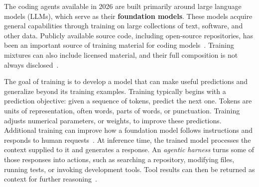 

The coding agents available in 2026 are built primarily around large language models (LLMs), which serve as their \textbf{foundation models}. These models acquire general capabilities through training on large collections of text, software, and other data. Publicly available source code, including open-source repositories, has been an important source of training material for coding models~\citep{chen2021codex}. Training mixtures can also include licensed material, and their full composition is not always disclosed~\citep{openai2023gpt4}.

The goal of training is to develop a model that can make useful predictions and generalize beyond its training examples. Training typically begins with a prediction objective: given a sequence of tokens, predict the next one. Tokens are units of representation, often words, parts of words, or punctuation. Training adjusts numerical parameters, or weights, to improve these predictions. Additional training can improve how a foundation model follows instructions and responds to human requests~\citep{ouyang2022instructions}. At inference time, the trained model processes the context supplied to it and generates a response. An \emph{agentic harness} turns some of those responses into actions, such as searching a repository, modifying files, running tests, or invoking development tools. Tool results can then be returned as context for further reasoning~\citep{yao2023react}.

